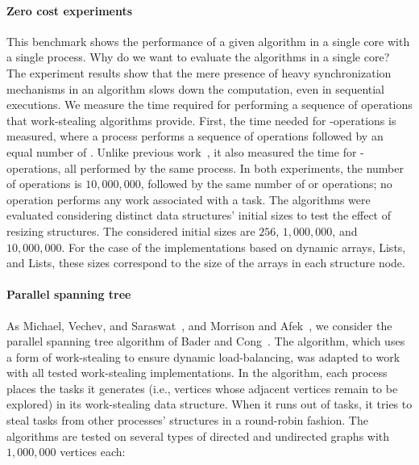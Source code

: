 \paragraph*{Zero cost experiments\label{zero-cost-experiment}}

This benchmark shows the performance of a given algorithm in a single core with a single process. Why do we want to evaluate the algorithms in a single core? The experiment results show that the mere presence of heavy synchronization mechanisms in an algorithm slows down the computation, even in sequential executions. We measure the time required for performing a sequence of operations that work-stealing algorithms provide. First, the time needed for \Put-\Take operations is measured, where a process performs a sequence of \Put operations followed by an equal number of \Takes. Unlike previous work~\cite{maged.vechev.2009, fencefreework}, it also measured the time for \Put-\Steal operations, all performed by the same process. In both experiments, the number of \Put operations is \(10,000,000\), followed by the same number of \Take or \Steal operations; no operation performs any work associated with a task. The algorithms were evaluated considering distinct data structures' initial sizes to test the effect of resizing structures. The considered initial sizes are \(256\), \(1,000,000\), and \(10,000,000\).  For the case of the implementations based on dynamic arrays, \NCWSM Lists, and \BNCWSM Lists, these sizes correspond to the size of the arrays in each structure node.

\paragraph*{Parallel spanning tree\label{irregular-graph}}
As Michael, Vechev, and Saraswat~\cite{maged.vechev.2009}, and Morrison and Afek~\cite{fencefreework}, we consider the parallel spanning tree algorithm of Bader and Cong~\cite{1302951}. The algorithm, which uses a form of work-stealing to ensure dynamic load-balancing, was adapted to work with all tested work-stealing implementations. In the algorithm, each process places the tasks it generates (i.e., vertices whose adjacent vertices remain to be explored) in its work-stealing data structure. When it runs out of tasks, it tries to steal tasks from other processes' structures in a round-robin fashion. The algorithms are tested on several types of directed and undirected graphs with $1,000,000$ vertices each:

